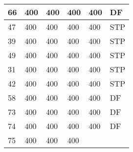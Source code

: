\begin{table}[]
\begin{tabular}{lllll|l|}
66                                  & 400                                & 400                                & 400                                & 
400                                & DF                                    \\ \hline
47                                  & 400                                & 400                                & 400                                & 
400                                & STP                                   \\ \hline
39                                  & 400                                & 400                                & 400                                & 
400                                & STP                                   \\ \hline
49                                  & 400                                & 400                                & 400                                & 
400                                & STP                                   \\ \hline
31                                  & 400                                & 400                                & 400                                & 
400                                & STP                                   \\ \hline
42                                  & 400                                & 400                                & 400                                & 
400                                & STP                                   \\ \hline
58                                  & 400                                & 400                                & 400                                & 
400                                & DF                                    \\ \hline
73                                  & 400                                & 400                                & 400                                & 
400                                & DF                                    \\ \hline
74                                  & 400                                & 400                                & 400                                & 
400                                & DF                                    \\ \hline
75                                  & 400                                & 400                                & 400                                & 

\end{tabular}
\end{table}
